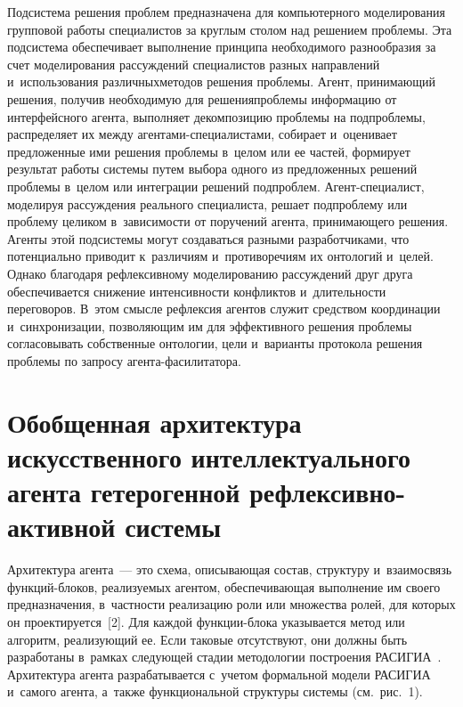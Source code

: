 \begin{multicols}{2}
  Подсистема решения проблем предназначена для компьютерного 
моделирования групповой работы специалистов за круглым столом над 
решением проб\-ле\-мы. Эта подсистема обеспечивает выполнение принципа 
необходимого разнообразия за счет моделирования рас\-суж\-де\-ний специалистов 
разных на\-прав\-ле\-ний и~использования различных\linebreak методов решения проб\-ле\-мы. 
Агент, при\-ни\-ма\-ющий решения, получив необходимую для решения\linebreak \mbox{проб\-ле\-мы} 
информацию от интерфейсного аген\-та, выполняет декомпозицию проб\-ле\-мы на 
под\-проб\-ле\-мы, распределяет их между аген\-та\-ми-спе\-ци\-а\-ли\-ста\-ми, 
собирает и~оценивает предложенные ими решения проб\-ле\-мы в~целом или ее 
частей, формирует результат работы сис\-те\-мы путем выбора одного из 
предложенных решений проб\-ле\-мы в~целом или интеграции решений  
под\-проб\-лем. Агент-спе\-ци\-а\-лист, моделируя рассуждения реального 
специалиста, решает под\-проб\-ле\-му или проб\-ле\-му целиком в~за\-ви\-си\-мости от 
поручений агента, при\-ни\-ма\-юще\-го решения. Агенты этой под\-сис\-те\-мы могут 
создаваться разными разработчиками, что потенциально приводит к~различиям 
и~противоречиям их онтологий и~целей. Однако благодаря рефлексивному 
моделированию рас\-суж\-де\-ний друг друга обеспечивается снижение 
ин\-тен\-сив\-ности конфликтов и~дли\-тель\-ности переговоров. В~этом смыс\-ле 
рефлексия агентов служит средством координации и~синхронизации, 
поз\-во\-ля\-ющим им для эффективного решения проб\-ле\-мы согласовывать 
собственные онтологии, цели и~варианты протокола решения проб\-ле\-мы по 
запросу аген\-та-фа\-си\-ли\-та\-тора.

  
  
\section{Обобщенная архитектура искусственного 
интеллектуального агента гетерогенной  
рефлексивно-активной системы}
  
  Архитектура агента~--- это схема, описывающая со\-став, структуру 
и~взаимосвязь функ\-ций-бло\-ков, ре\-а\-ли\-зу\-емых агентом, обес\-пе\-чи\-ва\-ющая 
выполнение им своего предназначения, в~част\-ности реализацию роли или 
множества ролей, для которых он проектируется~[2]. Для каждой  
функ\-ции-бло\-ка указывается метод или алгоритм, ре\-а\-ли\-зу\-ющий ее. Если 
таковые отсутствуют, они долж\-ны быть разработаны в~рамках сле\-ду\-ющей 
стадии методологии по\-стро\-ения \mbox{РАСИГИА}~\cite{12-lis}. Архитектура 
агента разрабатывается с~учетом формальной модели 
\mbox{РАСИГИА}~\cite{2-lis} и~самого агента, а~также функциональной 
структуры сис\-те\-мы (см.\ рис.~1).


\end{multicols}

